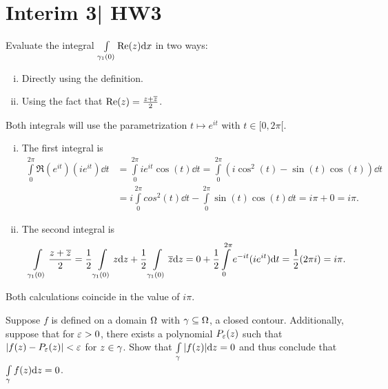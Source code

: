 \documentclass[12pt]{memoir}
\begin{document}
\section{Interim 3| HW3}

\begin{Ej}[Exercise 2]
    Evaluate the integral $\int\limits_{\gamma_1(0)}\Re(z)\dd x$ in two ways:
    \begin{enumerate}[i)]
        \itemsep=-0.4em
        \item Directly using the definition. 
        \item Using the fact that $\Re(z)=\frac{z+\overline z}{2}$.
    \end{enumerate}
\end{Ej}

\begin{ptcbr}
    Both integrals will use the parametrization $t\mapsto e^{it}$ with $t\in[0,2\pi[$.
    \begin{enumerate}[i)]
        \itemsep=-0.4em
        \item The first integral is 
        \begin{align*}
            \int\limits_{0}^{2\pi}\Re(e^{it})(ie^{it})\dd t&=\int\limits_{0}^{2\pi}ie^{it}\cos(t)\dd t=\int\limits_{0}^{2\pi}(i\cos^2(t)-\sin(t)\cos(t))\dd t\\
            &=i\int\limits_{0}^{2\pi}cos^2(t)\dd t-\int\limits_{0}^{2\pi}\sin(t)\cos(t)\dd t=i\pi+0=i\pi.
        \end{align*}
        \item The second integral is 
        $$\int\limits_{\ga_1(0)}^{}\frac{z+\ov z}{2}=\frac{1}{2}\int\limits_{\ga_1(0)}^{}z\dd z+\frac{1}{2}\int\limits_{\ga_1(0)}^{}\ov z\dd z=0+\half\int\limits_{0}^{2\pi}e^{-it}(ie^{it})\dd t=\half(2\pi i)=i\pi.$$
    \end{enumerate}
    Both calculations coincide in the value of $i\pi$.
\end{ptcbr}

\begin{Ej}
    Suppose $f$ is defined on a domain $\Omega$ with $\gamma\subseteq\Omega$, a closed contour. Additionally, suppose that for $\varepsilon>0$, there exists a polynomial $P_\varepsilon(z)$ such that $|f(z)-P_\varepsilon(z)|<\varepsilon$ for $z\in\gamma$. Show that $\int\limits_\gamma |f(z)|\dd z=0$ and thus conclude that $\int\limits_{\gamma}^{}f(z)\dd z=0$. 
\end{Ej}
\end{document}
